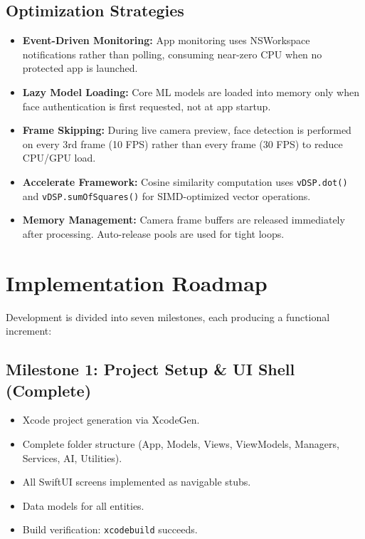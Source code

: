 \documentclass[12pt,a4paper]{report}
\begin{document}
\section{Optimization Strategies}
\begin{itemize}
    \item \textbf{Event-Driven Monitoring:} App monitoring uses NSWorkspace notifications rather than polling, consuming near-zero CPU when no protected app is launched.
    \item \textbf{Lazy Model Loading:} Core ML models are loaded into memory only when face authentication is first requested, not at app startup.
    \item \textbf{Frame Skipping:} During live camera preview, face detection is performed on every 3rd frame (10 FPS) rather than every frame (30 FPS) to reduce CPU/GPU load.
    \item \textbf{Accelerate Framework:} Cosine similarity computation uses \texttt{vDSP.dot()} and \texttt{vDSP.sumOfSquares()} for SIMD-optimized vector operations.
    \item \textbf{Memory Management:} Camera frame buffers are released immediately after processing. Auto-release pools are used for tight loops.
\end{itemize}

\chapter{Implementation Roadmap}

Development is divided into seven milestones, each producing a functional increment:

\section{Milestone 1: Project Setup \& UI Shell (Complete)}
\begin{itemize}[noitemsep]
    \item Xcode project generation via XcodeGen.
    \item Complete folder structure (App, Models, Views, ViewModels, Managers, Services, AI, Utilities).
    \item All SwiftUI screens implemented as navigable stubs.
    \item Data models for all entities.
    \item Build verification: \texttt{xcodebuild} succeeds.
\end{itemize}
\end{document}
